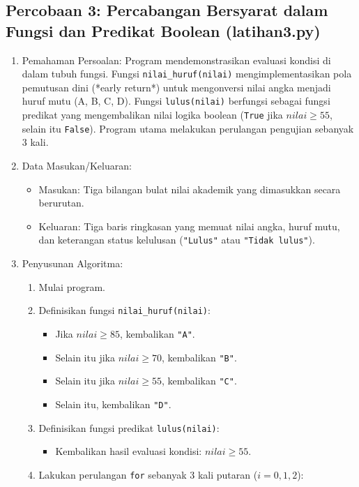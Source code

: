 \documentclass[12pt,a4paper]{article}
\begin{document}
\subsection{Percobaan 3: Percabangan Bersyarat dalam Fungsi dan Predikat Boolean (latihan3.py)}
\begin{enumerate}
    \item Pemahaman Persoalan: Program mendemonstrasikan evaluasi kondisi di dalam tubuh fungsi. Fungsi \texttt{nilai\_huruf(nilai)} mengimplementasikan pola pemutusan dini (*early return*) untuk mengonversi nilai angka menjadi huruf mutu (A, B, C, D). Fungsi \texttt{lulus(nilai)} berfungsi sebagai fungsi predikat yang mengembalikan nilai logika boolean (\texttt{True} jika $nilai \ge 55$, selain itu \texttt{False}). Program utama melakukan perulangan pengujian sebanyak 3 kali.
    \item Data Masukan/Keluaran:
    \begin{itemize}
        \item Masukan: Tiga bilangan bulat nilai akademik yang dimasukkan secara berurutan.
        \item Keluaran: Tiga baris ringkasan yang memuat nilai angka, huruf mutu, dan keterangan status kelulusan (\texttt{"Lulus"} atau \texttt{"Tidak lulus"}).
    \end{itemize}
    \item Penyusunan Algoritma:
    \begin{enumerate}[label=\alph*.]
        \item Mulai program.
        \item Definisikan fungsi \texttt{nilai\_huruf(nilai)}:
        \begin{itemize}
            \item Jika $nilai \ge 85$, kembalikan \texttt{"A"}.
            \item Selain itu jika $nilai \ge 70$, kembalikan \texttt{"B"}.
            \item Selain itu jika $nilai \ge 55$, kembalikan \texttt{"C"}.
            \item Selain itu, kembalikan \texttt{"D"}.
        \end{itemize}
        \item Definisikan fungsi predikat \texttt{lulus(nilai)}:
        \begin{itemize}
            \item Kembalikan hasil evaluasi kondisi: $nilai \ge 55$.
        \end{itemize}
        \item Lakukan perulangan \texttt{for} sebanyak 3 kali putaran ($i = 0, 1, 2$):

\end{enumerate}
\end{enumerate}
\end{document}
